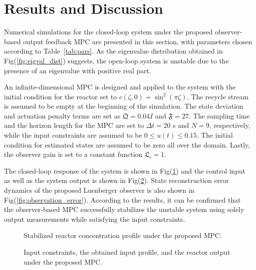 \section{Results and Discussion}
Numerical simulations for the closed-loop system under the proposed observer-based output feedback MPC are presented in this section, with parameters chosen according to Table~\ref{tab:pars}. As the eigenvalue distribution obtained in Fig(\ref{fig:eigval_dist}) suggests, the open-loop system is unstable due to the presence of an eigenvalue with positive real part. 

An infinite-dimensional MPC is designed and applied to the system with the initial condition for the reactor set to $c(\zeta,0) = \sin^2(\pi \zeta)$. The recycle stream is assumed to be empty at the beginning of the simulation. The state deviation and actuation penalty terms are set as $\mathfrak{Q} = 0.04 I$ and $\mathfrak{F} = 27$. The sampling time and the horizon length for the MPC are set to $\Delta t = 20$ s and $N = 9$, respectively, while the input constraints are assumed to be $0 \leq u(t) \leq 0.15$. The initial condition for estimated states are assumed to be zero all over the domain. Lastly, the observer gain is set to a constant function $\mathfrak{L}_c = 1$. 

The closed-loop response of the system is shown in Fig(\ref{fig:closedloop_response}) and the control input as well as the system output is shown in Fig(\ref{fig:control_input}). State reconstruction error dynamics of the proposed Luenberger observer is also shown in Fig(\ref{fig:observation_error}). According to the results, it can be confirmed that the observer-based MPC successfully stabilizes the unstable system using solely output measurements while satisfying the input constraints.

\begin{figure}[!htbp]
    \centering
    
    \caption{Stabilized reactor concentration profile under the proposed MPC.}
    \label{fig:closedloop_response}
\end{figure}

\begin{figure}[!htbp]
    \centering
    
    \caption{Input constraints, the obtained input profile, and the reactor output under the proposed MPC.}
    \label{fig:control_input}
\end{figure}


